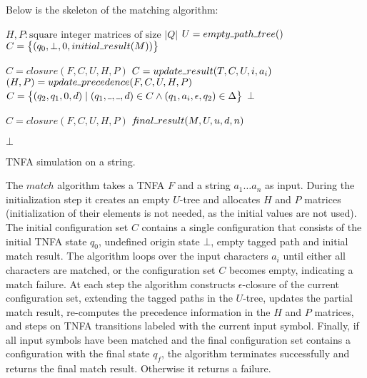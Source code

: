\documentclass[AMA,STIX1COL]{WileyNJD-v2}
\newcommand{\Xund}{\rule{.4em}{.4pt}}
\begin{document}
Below is the skeleton of the matching algorithm:

\begin{algorithm}[H] \DontPrintSemicolon {} 
 {

    $H, P : \text{square integer matrices of size } |Q|$ \;
    $U = empty \Xund path \Xund tree()$ \;
    $C = \big\{ (q_0, \bot, 0, initial \Xund result(M)) \big\}$ \;

    \BlankLine
     {
        $C = closure(F, C, U, H, P)$ \;
        $C = update \Xund result(T, C, U, i, a_i)$ \;
        $(H, P) = update \Xund precedence(F, C, U, H, P)$ \;
        $C = \big\{ (q_2, q_1, 0, d) \mid (q_1, \Xund, \Xund, d) \in C \wedge (q_1, a_i, \epsilon, q_2) \in \Delta \big\}$ \;
         {
            \Return $\bot$
        }
    }

    \BlankLine
    $C = closure(F, C, U, H, P)$ \;
    \If {$\exists (q, \Xund, u, d) \in C \mid q = q_f$} {
        \Return $f\!inal \Xund result (M, U, u, d, n)$
    }

    \BlankLine
    \Return $\bot$

    \BlankLine
}
\caption{TNFA simulation on a string.}\label{alg_match}
\end{algorithm}
\medskip

The $match$ algorithm takes a TNFA $F$ and a string $a_1 \hdots a_n$ as input.
%
During the initialization step it creates an empty $U$-tree and allocates $H$ and $P$ matrices
(initialization of their elements is not needed, as the initial values are not used).
The initial configuration set $C$ contains a single configuration
that consists of the initial TNFA state $q_0$, undefined origin state $\bot$, empty tagged path and initial match result.
%
The algorithm loops over the input characters $a_i$ until either all characters are matched,
or the configuration set $C$ becomes empty, indicating a match failure.
%
At each step the algorithm constructs $\epsilon$-closure of the current configuration set, extending the tagged paths in the $U$-tree,
updates the partial match result,
re-computes the precedence information in the $H$ and $P$ matrices,
and steps on TNFA transitions labeled with the current input symbol.
%
Finally, if all input symbols have been matched and the final configuration set contains a configuration with the final state $q_f$,
the algorithm terminates successfully and returns the final match result.
Otherwise it returns a failure.
\\
\end{document}

